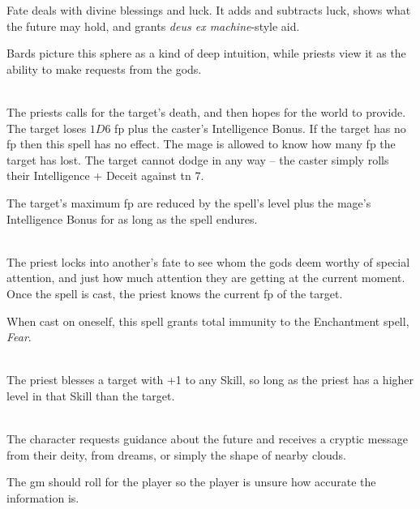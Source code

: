 \begin{multicols}{2}

\noindent
Fate deals with divine blessings and luck.
It adds and subtracts luck, shows what the future may hold, and grants \textit{deus ex machine}-style aid.

Bards picture this sphere as a kind of deep intuition, while priests view it as the ability to make requests from the gods.

\spelllevel

\\
The priests calls for the target's death, and then hopes for the world to provide.
The target loses $1D6$ \gls{fp} plus the caster's Intelligence Bonus.
If the target has no \gls{fp} then this spell has no effect.
The mage is allowed to know how many \gls{fp} the target has lost.
The target cannot dodge in any way -- the caster simply rolls their Intelligence + Deceit against \gls{tn} 7.

The target's maximum \gls{fp} are reduced by the spell's level plus the mage's Intelligence Bonus for as long as the spell endures.

\\
The priest locks into another's fate to see whom the gods deem worthy of special attention, and just how much attention they are getting at the current moment.
Once the spell is cast, the priest knows the current \gls{fp} of the target.

When cast on oneself, this spell grants total immunity to the Enchantment spell, \textit{Fear}.

\\
The priest blesses a target with +1 to any Skill, so long as the priest has a higher level in that Skill than the target.

\spelllevel

\\
The character requests guidance about the future and receives a cryptic message from their deity, from dreams, or simply the shape of nearby clouds.

The \gls{gm} should roll for the player so the player is unsure how accurate the information is.


\end{multicols}
